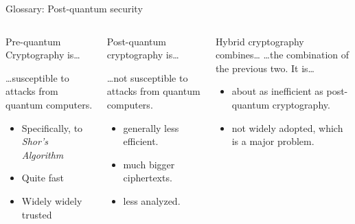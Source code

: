 \begin{frame}{Glossary: Post-quantum security}
\vspace{-\ht\strutbox}
  \begin{columns}[t]
    \begin{column}{.30\linewidth}
      \begin{block}{Pre-quantum Cryptography is… \strut}

      …susceptible to attacks from quantum computers.

      \vspace{0.5em}
      \begin{itemize}
        \item Specifically, to \emph{Shor's Algorithm} %
        \item Quite fast
        \item Widely widely trusted
      \end{itemize}
      \end{block}
    \end{column}

    \begin{column}{.33\linewidth}
      \begin{block}{Post-quantum cryptography is…}

        …not susceptible to attacks from quantum computers.

      \vspace{0.5em}
      \begin{itemize}
        \item generally less efficient.
        \item much bigger ciphertexts.
        \item less analyzed.
      \end{itemize}
      \end{block}
    \end{column}

    \begin{column}{.36\linewidth}
      \begin{block}{Hybrid cryptography combines…}
        …the combination of the previous two. It is…


        \vspace{0.3em}
        \begin{itemize}
          \item about as inefficient as post-quantum cryptography.
          \item not widely adopted, which is a major problem.
        \end{itemize}
      \end{block}
    \end{column}
  \end{columns}
\end{frame}





